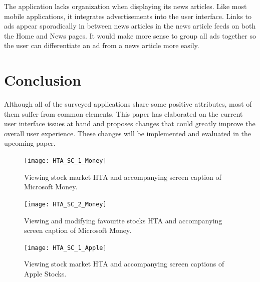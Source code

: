 \documentclass{sigchi}
\begin{document}
The application lacks organization when displaying its news articles. Like most mobile applications, it integrates advertisements into the user interface. Links to ads appear sporadically in between news articles in the news article feeds on both the Home and News pages. It would make more sense to group all ads together so the user can differentiate an ad from a news article more easily. 

\section{Conclusion}
Although all of the surveyed applications share some positive attributes, most of them suffer from common elements. This paper has elaborated on the current user interface issues at hand and proposes changes that could greatly improve the overall user experience. These changes will be implemented and evaluated in the upcoming paper. 

\begin{figure}
	\texttt{[image: HTA\_SC\_1\_Money]}
	\caption{Viewing stock market HTA and accompanying screen caption of Microsoft Money.}
	\label{fig:figure1}
\end{figure}

\begin{figure}
	\texttt{[image: HTA\_SC\_2\_Money]}
	\caption{Viewing and modifying favourite stocks HTA and accompanying screen caption of Microsoft Money.}
	\label{fig:figure2}
\end{figure}

\begin{figure}
	\begin{center}
		\texttt{[image: HTA\_SC\_1\_Apple]}
	\end{center}
	\caption{Viewing stock market HTA and accompanying screen captions of Apple Stocks.}
	\label{fig:figure3}
\end{figure}
\end{document}
